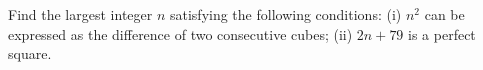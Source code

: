 Find the largest integer $ n$ satisfying the following conditions:
(i) $ n^2$ can be expressed as the difference of two consecutive cubes;
(ii) $ 2n+79$ is a perfect square.